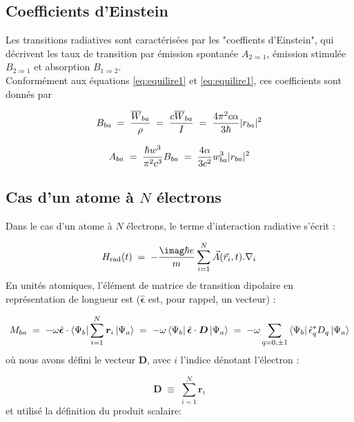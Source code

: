     \subsection{Coefficients d'Einstein}



Les transitions radiatives sont caractérisées par les "coeffients d'Einstein", qui décrivent les taux de transition par émission spontanée $A_{2\Rightarrow1}$, émission stimulée $B_{2\Rightarrow 1}$ et absorption $B_{1\Rightarrow2}$.\\
Conformément aux équations \eqref{eq:equilire1} et \eqref{eq:equilire1}, ces coefficients sont donnés par

\begin{equation}
    B_{ba}\; = \; \dfrac{\overline{W}_{ba}}{\rho}\; = \; \dfrac{c\overline{W}_{ba}}{I}\; = \; \dfrac{4\pi^2 c \alpha}{3 \hbar}|r_{ba}|^2
\end{equation}

\begin{equation}
    A_{ba}\; = \; \dfrac{\hbar w^3}{\pi^2 c^3}B_{ba}\; = \; \dfrac{4 \alpha}{3 c^2}w_{ba}^3|r_{ba}|^2
\end{equation}





\subsection{Cas d'un atome à $N$ électrons}

Dans le cas d'un atome à $N$ électrons, le terme d'interaction radiative s'écrit :

\begin{equation}
    H_\text{rad}(t)\eq -\dfrac{\imag\hbar e}{m}\sum_{i=1}^{N} \vec{A}(\vec{r}_i,t).\nabla_i
\end{equation}
En unités atomiques, l'élément de matrice de transition dipolaire en représentation de longueur est ($\hat{\bm{\epsilon}}$ est, pour rappel, un vecteur) :

\begin{equation}
    M_{ba} \; = \;
    -\omega \hat{\bm{\epsilon}}\cdot\bra{\Psi_b}\sum_{i=1}^{N} \bm{r}_i\ket{\Psi_a}
    \; = \;
    -\omega \bra{\Psi_b}\hat{\bm{\epsilon}} \cdot \bm{D}\ket{\Psi_a}
    \; = \;
    -\omega \sum_{q=0,\pm 1}\bra{\Psi_b}\hat{\epsilon}_q^* D_q\ket{\Psi_a}
\end{equation}
où nous avons défini le vecteur $\bm{D}$, avec $i$ l'indice dénotant l'électron :

\[
    \bm{D} \;\equiv\; \sum_{i=1}^N \bm{r}_i
\]
et utilisé la définition du produit scalaire:

